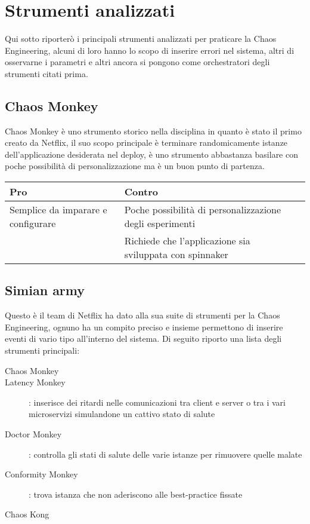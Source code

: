 \section{Strumenti analizzati}
Qui sotto riporterò i principali strumenti analizzati per praticare la Chaos Engineering, alcuni di loro hanno lo scopo di inserire errori nel sistema, altri di osservarne i parametri e altri ancora si pongono come orchestratori degli strumenti citati prima.

\subsection{Chaos Monkey}
Chaos Monkey è uno strumento storico nella disciplina in quanto è stato il primo creato da Netflix, il suo scopo principale è terminare randomicamente istanze dell'applicazione desiderata nel deploy, è uno strumento abbastanza basilare con poche possibilità di personalizzazione ma è un buon punto di partenza.
\begin{center}%
    \label{tab:chaos-monkey}
    \begin{tabularx}{\textwidth}{lXl}
    \hline\hline
    \textbf{Pro} & \textbf{Contro}\\
    \hline
    Semplice da imparare e configurare & Poche possibilità di personalizzazione degli esperimenti \\
     & Richiede che l'applicazione sia sviluppata con \gls{spinnaker} \\
    \hline
    \end{tabularx}
    \end{center}%

\subsection{Simian army}
Questo è il team di Netflix ha dato alla sua suite di strumenti per la Chaos Engineering, ognuno ha un compito preciso e insieme permettono di inserire eventi di vario tipo all'interno del sistema.
Di seguito riporto una lista degli strumenti principali:
\begin{description}
    \item[Chaos Monkey]
    \item[Latency Monkey]: inserisce dei ritardi nelle comunicazioni tra client e server o tra i vari microservizi simulandone un cattivo stato di salute
    \item[Doctor Monkey]: controlla gli stati di salute delle varie istanze per rimuovere quelle malate
    \item[Conformity Monkey]: trova istanza che non aderiscono alle best-practice fissate
    \item[Chaos Kong]  
\end{description}

